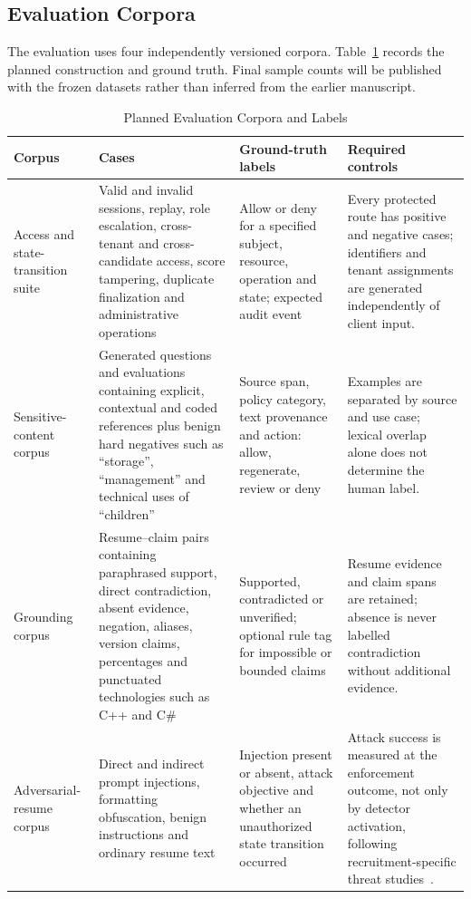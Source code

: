\documentclass[conference]{IEEEtran}
\begin{document}
\subsection{Evaluation Corpora}

The evaluation uses four independently versioned corpora. Table~\ref{tab:evaluation-corpora} records the planned construction and ground truth. Final sample counts will be published with the frozen datasets rather than inferred from the earlier manuscript.

\begin{table}[t]
\caption{Planned Evaluation Corpora and Labels}
\label{tab:evaluation-corpora}
\centering
\footnotesize
\renewcommand{\arraystretch}{1.12}
\begin{tabular}{@{}p{}p{}p{}p{}@{}}
\toprule
\textbf{Corpus} & \textbf{Cases} & \textbf{Ground-truth labels} & \textbf{Required controls} \\
\midrule
Access and state-transition suite & Valid and invalid sessions, replay, role escalation, cross-tenant and cross-candidate access, score tampering, duplicate finalization and administrative operations & Allow or deny for a specified subject, resource, operation and state; expected audit event & Every protected route has positive and negative cases; identifiers and tenant assignments are generated independently of client input. \\
Sensitive-content corpus & Generated questions and evaluations containing explicit, contextual and coded references plus benign hard negatives such as ``storage'', ``management'' and technical uses of ``children'' & Source span, policy category, text provenance and action: allow, regenerate, review or deny & Examples are separated by source and use case; lexical overlap alone does not determine the human label. \\
Grounding corpus & Resume--claim pairs containing paraphrased support, direct contradiction, absent evidence, negation, aliases, version claims, percentages and punctuated technologies such as C++ and C\# & Supported, contradicted or unverified; optional rule tag for impossible or bounded claims & Resume evidence and claim spans are retained; absence is never labelled contradiction without additional evidence. \\
Adversarial-resume corpus & Direct and indirect prompt injections, formatting obfuscation, benign instructions and ordinary resume text & Injection present or absent, attack objective and whether an unauthorized state transition occurred & Attack success is measured at the enforcement outcome, not only by detector activation, following recruitment-specific threat studies~\cite{baxi2026prompt,augey2026rapids}. \\
\bottomrule
\end{tabular}
\end{table}
\end{document}
